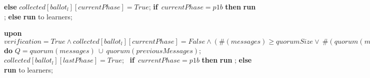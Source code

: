 \documentclass[10pt,pdftex,a4paper]{article}%
\begin{document}
\begin{algorithm}
\begin{algorithmic}[1]
            
        \State \hspace{\algorithmicindent} \textbf{else}
            \State \hspace{\algorithmicindent}\hspace{\algorithmicindent} $collected[ballot_l][currentPhase] = True$;
            \State \hspace{\algorithmicindent}\hspace{\algorithmicindent} \textbf{if}\ $currentPhase = p1b$ \textbf{then}
            \State \hspace{\algorithmicindent}\hspace{\algorithmicindent}\hspace{\algorithmicindent} 
            \textbf{run} ;
            \State \hspace{\algorithmicindent}\hspace{\algorithmicindent} \textbf{else}
            \State \hspace{\algorithmicindent}\hspace{\algorithmicindent}\hspace{\algorithmicindent} \textbf{run}  to learners;
            
    \State
    \State \textbf{upon} $verification = True \land collected[ballot_l][currentPhase] = False \land (\#(messages) \geq quorumSize \lor\ \#(quorum(messages)\ \cup\ quorum(previousMessages)) \geq n-s)$ \textbf{do}
    \State \hspace{\algorithmicindent} $Q = quorum(messages)\ \cup\ quorum(previousMessages)$;
    \State \hspace{\algorithmicindent} $collected[ballot_l][lastPhase] = True$;
    \State\ \hspace{\algorithmicindent}\textbf{if}\ $currentPhase = p1b$ \textbf{then}
            \State \hspace{\algorithmicindent}\hspace{\algorithmicindent} 
            \textbf{run} ;
            \State \hspace{\algorithmicindent} \textbf{else}
            \State \hspace{\algorithmicindent}\hspace{\algorithmicindent} \textbf{run}  to learners;

\end{algorithmic}
\end{algorithm}
\end{document}
